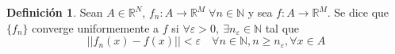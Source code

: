 \documentclass[11pt,twoside,titlepage,a4paper]{article}
\theoremstyle{plain}
\theoremstyle{definition}
\newtheorem{defi}{Definición}[section]
\theoremstyle{remark}
\begin{document}
\begin{defi}
	Sean $A\in\mathbb{R}^N$, $f_n:A\to\mathbb{R}^M\;\forall n\in\mathbb{N}$ y sea $f:A\to\mathbb{R}^M$.
	Se dice que $\{f_n\}$ converge uniformemente a $f$ si $\forall\varepsilon>0,\:\exists n_\varepsilon
	\in\mathbb{N}$ tal que
	\begin{equation*}
	||f_n(x)-f(x)||<\varepsilon\quad\forall n\in\mathbb{N},n\geq n_\varepsilon,\forall x\in A
	\end{equation*}
\end{defi}
\end{document}
